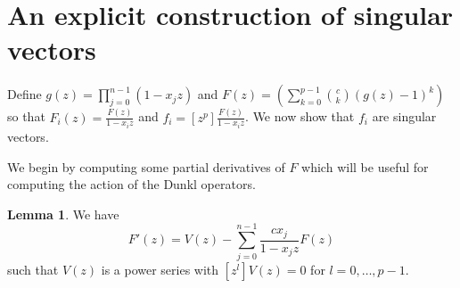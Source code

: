 \documentclass{amsart}
\numberwithin{equation}{section}
\theoremstyle{definition}
\newtheorem{lemma}[theorem]{Lemma}
\begin{document}

\section{An explicit construction of singular vectors}

Define $g(z)=\prod_{j=0}^{n-1} (1-x_jz)$ and $F(z) =\left(\sum_{k=0}^{p-1} \binom{c}{k} (g(z)-1)^k\right)$ so that $F_i(z) = \frac{F(z)}{1-x_iz}$ and $f_i = [z^p] \frac{F(z)}{1-x_iz}$.  We now show that $f_i$ are singular vectors.


We begin by computing some partial derivatives of $F$ which will be useful for computing the action of the Dunkl operators.

\begin{lemma}\label{lem:dFdz} We have
\[
F'(z) = V(z) - \sum_{j=0}^{n-1} \frac{cx_j}{1-x_jz} F(z)
\]
such that $V(z)$ is a power series with $[z^l]V(z)=0$ for $l=0,\dots,p-1$. 
\end{lemma}
\end{document}
